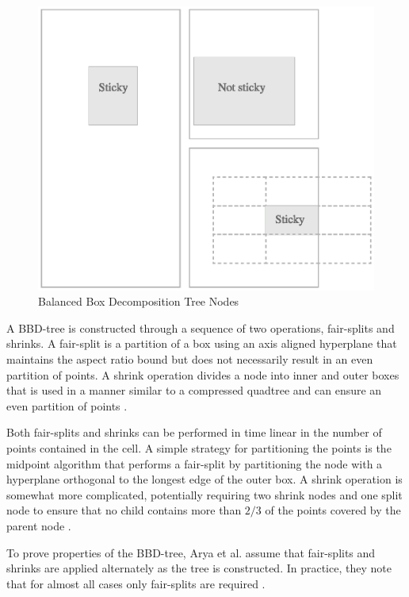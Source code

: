 \documentclass[mcs]{scsthesis}
\begin{document}
\begin{figure}
\begin{center}
\includegraphics[scale=0.5]{diagrams/bbd_tree_node.eps}
\caption{Balanced Box Decomposition Tree Nodes}
\label{fig:bbd_tree_node}
\end{center}
\end{figure}

A BBD-tree is constructed through a sequence of two operations, fair-splits
and shrinks. A fair-split is a partition of a box using an axis aligned
hyperplane that maintains the aspect ratio bound but does not necessarily
result in an even partition of points. A shrink operation divides a node into
inner and outer boxes that is used in a manner similar to a compressed
quadtree and can ensure an even partition of points \cite{optimalann}.

Both fair-splits and shrinks can be performed in time linear in the number of
points contained in the cell. A simple strategy for partitioning the points is
the midpoint algorithm that performs a fair-split by partitioning the node
with a hyperplane orthogonal to the longest edge of the outer box. A shrink
operation is somewhat more complicated, potentially requiring two shrink nodes
and one split node to ensure that no child contains more than \(2/3\) of the
points covered by the parent node \cite{optimalann}.

To prove properties of the BBD-tree, Arya et al. assume that fair-splits and
shrinks are applied alternately as the tree is constructed. In practice, they
note that for almost all cases only fair-splits are required \cite{optimalann}. 
\end{document}
